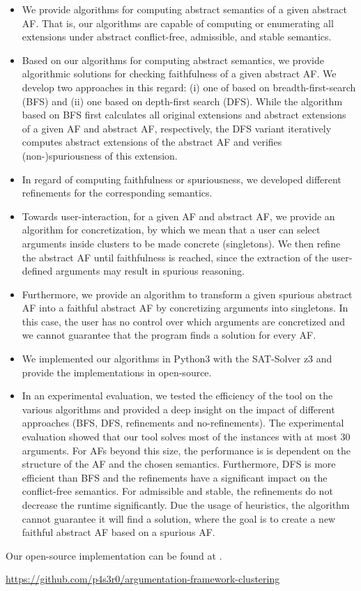 \begin{itemize}
    \item We provide algorithms for computing abstract semantics of a given abstract AF. That is, our algorithms are capable of computing or enumerating all extensions under abstract conflict-free, admissible, and stable semantics.

    \item Based on our algorithms for computing abstract semantics, we provide algorithmic solutions for checking faithfulness of a given abstract AF. We develop two approaches in this regard: (i) one of based on breadth-first-search (BFS) and (ii) one based on depth-first search (DFS). While the algorithm based on BFS first calculates all original extensions and abstract extensions of a given AF and abstract AF, respectively, the DFS variant iteratively computes abstract extensions of the abstract AF and verifies (non-)spuriousness of this extension.

    \item In regard of computing faithfulness or spuriousness, we developed different refinements for the corresponding semantics.

    \item Towards user-interaction, for a given AF and abstract AF, we provide an algorithm for concretization, by which we mean that a user can select arguments inside clusters to be made concrete (singletons). We then refine the abstract AF until faithfulness is reached, since the extraction of the user-defined arguments may result in spurious reasoning. 

    \item Furthermore, we provide an algorithm to transform a given spurious abstract AF into a faithful abstract AF by concretizing arguments into singletons. In this case, the user has no control over which arguments are concretized and we cannot guarantee that the program finds a solution for every AF.

    \item We implemented our algorithms in Python3 with the SAT-Solver z3 and provide the implementations in open-source.

    \item In an experimental evaluation, we tested the efficiency of the tool on the various algorithms and provided a deep insight on the impact of different approaches (BFS, DFS, refinements and no-refinements). The experimental evaluation showed that our tool solves most of the instances with at most 30 arguments. For AFs beyond this size, the performance is is dependent on the structure of the AF and the chosen semantics. Furthermore, DFS is more efficient than BFS and the refinements have a significant impact on the conflict-free semantics. For admissible and stable, the refinements do not decrease the runtime significantly. Due the usage of heuristics, the algorithm cannot guarantee it will find a solution, where the goal is to create a new faithful abstract AF based on a spurious AF.
\end{itemize}

Our open-source implementation can be found at \cite{Pasero2024-AFClustering-Repo}.

\begin{center}
    \url{https://github.com/p4s3r0/argumentation-framework-clustering}
\end{center}

